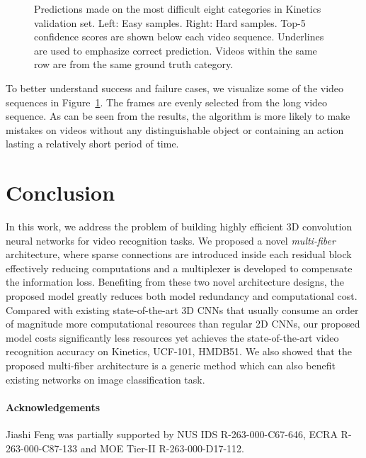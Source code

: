 \documentclass[runningheads]{llncs}
\newcommand{\switch}[0]{multiplexer\xspace}
\begin{document}
\begin{figure}[]
	\center
	\caption{Predictions made on the most difficult eight categories in Kinetics validation set. Left: Easy samples. Right: Hard samples. Top-5 confidence scores are shown below each video sequence. Underlines are used to emphasize correct prediction. Videos within the same row are from the same ground truth category.} 
	\label{fig_video_clips}
\end{figure}

To better understand success and failure cases, we visualize some of the video sequences in Figure~\ref{fig_video_clips}. The frames are evenly selected from the long video sequence. As can be seen from the results, the algorithm is more likely to make mistakes on videos without any distinguishable object or containing an action lasting a relatively short period of time.

 
\section{Conclusion}
\label{sec:conclusions}

In this work, we address the problem of building highly efficient 3D convolution neural networks for video recognition tasks. We proposed a novel \textit{multi-fiber} architecture, where sparse connections are introduced inside each residual block effectively reducing computations and a \switch is developed to compensate the information loss. Benefiting from these two novel architecture designs, the proposed model greatly reduces both model redundancy and computational cost. Compared with existing state-of-the-art 3D CNNs that usually consume an order of magnitude more computational resources than regular 2D CNNs, our proposed model costs significantly less resources yet achieves the state-of-the-art video recognition accuracy on Kinetics, UCF-101, HMDB51. We also showed that the proposed multi-fiber architecture is a generic method which can also benefit existing networks on image classification task.

 
\paragraph{Acknowledgements}
Jiashi Feng was partially supported by NUS IDS R-263-000-C67-646, ECRA R-263-000-C87-133 and MOE Tier-II R-263-000-D17-112. 


\end{document}
